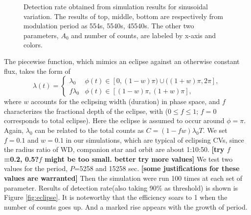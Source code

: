\documentclass[twoside,twocolumn]{aastex63}
\begin{document}
\begin{figure}[htbp]
\caption{Detection rate obtained from simulation results for sinusoidal variation. The results of top, middle, bottom are respectively from modulation period as 554s, 5540s, 45540s. The other two parameters, $A_{0}$ and number of counts, are labeled by x-axis and colors. \label{fig:detection}}
\end{figure}

The piecewise function, which mimics an eclipse against an otherwise constant flux, takes the form of
\begin{equation}
\lambda(t)=
\begin{cases}
\lambda_0 & \text{$\phi(t) \in[0,(1-w)\pi)\cup ((1+w)\pi,2\pi]$},\\
f\lambda_0 & \text{$\phi(t) \in[(1-w)\pi,(1+w)\pi]$},
\end{cases}	
\end{equation}
where $w$ accounts for the eclipsing width (duration) in phase space, and $f$ characterizes the fractional depth of the eclipse, with ($0\leq f \leq 1$; $f = 0$ corresponds to total eclipse). Here the eclipse is assumed to occur around $\phi = \pi$. 
Again, $\lambda_0$ can be related to the total counts as $C=(1-fw)\lambda_0T$.
We set $f=0.1$ and $w=0.1$ in our simulations, which are typical of eclipsing CVs, since the radius ratio of WD, companion star and orbit are about 1:10:50. {\bf [try $f$ =0.2, 0.5?$f$ might be too small. better try more values]}
We test two values for the period, $P$=5258 and 15258 sec. {\bf [some justifications for these values are warranted]} 
Then the simulation were run 100 times at each set of parameter. Results of detection rate(also taking 90\% as threshold) is shown is Figure \ref{fig:eclipse}. It is noteworthy that the efficiency soars to 1 when the number of counts goes up. And a marked rise appears with the growth of period.
 
\end{document}
